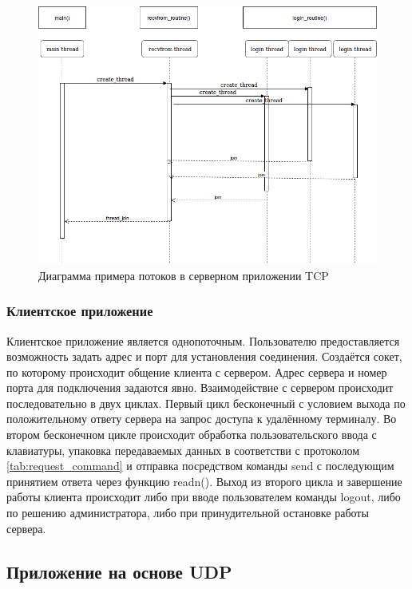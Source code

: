 \begin{figure}[H]
\centering
\includegraphics[width=1\textwidth]{pics/tcpthread.png}
\caption{Диаграмма примера потоков в серверном приложении TCP}
\label{tcp_thr}
\end{figure}

\subsubsection{Клиентское приложение}

Клиентское приложение является однопоточным. Пользователю предоставляется возможность задать адрес и порт для установления соединения. Создаётся сокет, по которому происходит общение клиента с сервером. Адрес сервера и номер порта для подключения задаются явно. Взаимодействие с сервером происходит последовательно в двух циклах. Первый цикл бесконечный с условием выхода по положительному ответу сервера на запрос доступа к удалённому терминалу. Во втором бесконечном цикле происходит обработка пользовательского ввода с клавиатуры, упаковка передаваемых данных в соответстви с протоколом \ref{tab:request_command} и отправка посредством команды send с последующим принятием ответа через функцию readn(). Выход из второго цикла и завершение работы клиента происходит либо при вводе пользователем команды logout, либо по решению администратора, либо при принудительной остановке работы сервера.

\subsection{Приложение на основе UDP}
